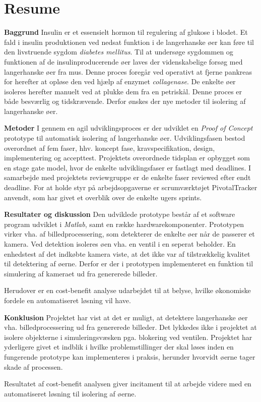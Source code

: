 \section*{Resume}
\textbf{Baggrund}
Insulin er et essensielt hormon til regulering af glukose i blodet. Et fald i insulin produktionen ved nedsat funktion i de langerhanske øer kan føre til den livstruende sygdom \textit{diabetes mellitus}. Til at undersøge sygdommen og funktionen af de insulinproducerende øer laves der videnskabelige forsøg med langerhanske øer fra mus. Denne proces foregår ved operativt at fjerne pankreas for herefter at opløse den ved hjælp af enzymet \textit{collagenase}. De enkelte øer isoleres herefter manuelt ved at plukke dem fra en petriskål. Denne proces er både besværlig og tidskrævende. Derfor ønskes der nye metoder til isolering af langerhanske øer.

\textbf{Metoder} I gennem en agil udviklingsproces er der udviklet en \textit{Proof of Concept} prototype til automatisk isolering af langerhanske øer. Udviklingsfasen bestod overordnet af fem faser, hhv. koncept fase, kravspecifikation, design, implementering og accepttest. Projektets overordnede tidsplan er opbygget som en stage gate model, hvor de enkelte udviklingsfaser er fastlagt med deadlines. I samarbejde med projektets reviewgruppe er de enkelte faser reviewed efter endt deadline. For at holde styr på arbejdsopgaverne er scrumværktøjet PivotalTracker anvendt, som har givet et overblik over de enkelte ugers sprints.

\textbf{Resultater og diskussion} Den udviklede prototype består af et software program udviklet i \textit{Matlab}, samt en række hardwarekomponenter. Prototypen virker vha. af billedprocessering, som detekterer de enkelte øer når de passerer et kamera. Ved detektion isoleres øen vha. en ventil i en seperat beholder. En enhedstest af det indkøbte kamera viste, at det ikke var af tilstrækkelig kvalitet til detektering af øerne. Derfor er der i prototypen implementeret en funktion til simulering af kameraet ud fra genererede billeder.
 
Herudover er en cost-benefit analyse udarbejdet til at belyse, hvilke økonomiske fordele en automatiseret løsning vil have.   


\textbf{Konklusion} Projektet har vist at det er muligt, at detektere langerhanske øer vha. billedprocessering ud fra genererede billeder. Det lykkedes ikke i projektet at isolere objekterne i simuleringsvæsken pga. blokering ved ventilen. Projektet har yderligere givet et indblik i hvilke problemstillinger der skal løses inden en fungerende prototype kan implementeres i praksis, herunder hvorvidt øerne tager skade af processen. 

Resultatet af cost-benefit analysen giver incitament til at arbejde videre med en automatiseret løsning til isolering af øerne. 



